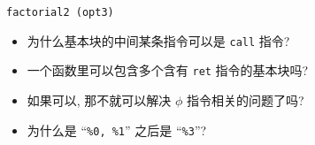 \begin{frame}{}
	\vspace{-0.50cm}
\end{frame}

\begin{frame}{}
	\begin{center}

		\vspace{-0.30cm}
		\texttt{factorial2 (opt3)}
	\end{center}
\end{frame}

\begin{frame}{}
	\begin{center}
	\end{center}

	\pause
	\begin{itemize}[<+->]
		\setlength{\itemsep}{10pt}
		\item 为什么基本块的中间某条指令可以是 \texttt{call} 指令?
		\item 一个函数里可以包含多个含有 \texttt{ret} 指令的基本块吗?
		\item 如果可以, 那不就可以解决 $\phi$ 指令相关的问题了吗?
		\item 为什么是 ``\texttt{\%0, \%1}'' 之后是 ``\texttt{\%3}''?
	\end{itemize}
\end{frame}
